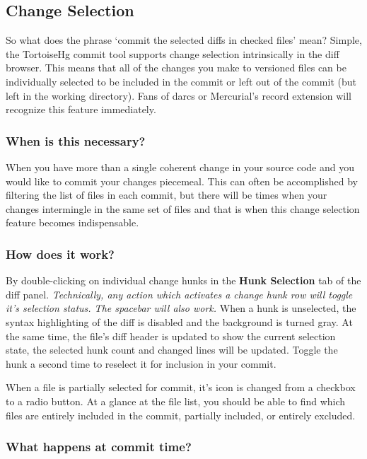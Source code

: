\documentclass[letterpaper,10pt,english]{manual}
\begin{document}
\subsection{Change Selection}

So what does the phrase `commit the selected diffs in checked files'
mean?  Simple, the TortoiseHg commit tool supports change selection
intrinsically in the diff browser. This means that all of the changes
you make to versioned files can be individually selected to be included
in the commit or left out of the commit (but left in the working
directory).  Fans of darcs or Mercurial's record extension will
recognize this feature immediately.


\subsubsection{When is this necessary?}

When you have more than a single coherent change in your source code and
you would like to commit your changes piecemeal.  This can often be
accomplished by filtering the list of files in each commit, but there
will be times when your changes intermingle in the same set of files and
that is when this change selection feature becomes indispensable.


\subsubsection{How does it work?}

By double-clicking on individual change hunks in the
\textbf{Hunk Selection} tab of the diff panel.  \emph{Technically, any
action which activates a change hunk row will toggle it's selection
status. The spacebar will also work.} When a hunk is unselected, the
syntax highlighting of the diff is disabled and the background is turned
gray.  At the same time, the file's diff header is updated to show the
current selection state, the selected hunk count and changed lines will
be updated. Toggle the hunk a second time to reselect it for inclusion
in your commit.

When a file is partially selected for commit, it's icon is changed from
a checkbox to a radio button. At a glance at the file list, you should
be able to find which files are entirely included in the commit,
partially included, or entirely excluded.


\subsubsection{What happens at commit time?}
\end{document}
